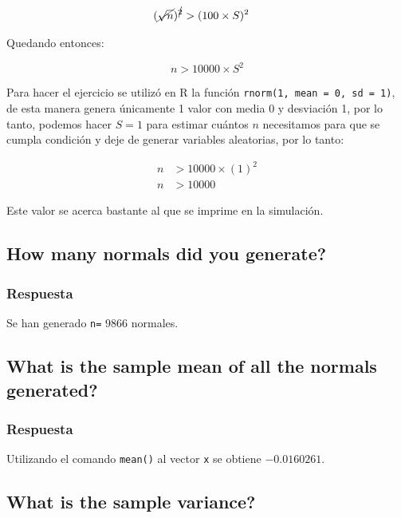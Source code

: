 \documentclass[12pt]{article}\usepackage[]{graphicx}\usepackage[]{xcolor}
\begin{document}
\begin{align*}
  (\cancel{\sqrt{n}})^{\cancel{2}} &> (100 \times S)^{2} 
\end{align*}

Quedando entonces:

\[
n > 10000\times S^{2}
\]

Para hacer el ejercicio se utilizó en \textsf{R} la función \texttt{rnorm(1, mean = 0, sd = 1)}, de esta manera genera únicamente 1 valor con media 0 y desviación 1, por lo tanto, podemos hacer $S = 1$ para estimar cuántos $n$ necesitamos para que se cumpla condición y deje de generar variables aleatorias, por lo tanto:

\begin{align*}
  n &> 10000 \times (1)^{2} \\
  n &> 10000 
\end{align*}

Este valor se acerca bastante al que se imprime en la simulación. 











\subsection{How many normals did you generate?}
\label{subsec:p1-b}

\subsubsection{Respuesta}

Se han generado \lstinline|n=| $9866$ normales.


\subsection{What is the sample mean of all the normals generated?}
\label{subsec:p1-c}




\subsubsection{Respuesta}

Utilizando el comando \lstinline|mean()| al vector \lstinline|x| se obtiene $-0.0160261$. 

\subsection{What is the sample variance?}
\label{subsec:p1-d}
\end{document}
